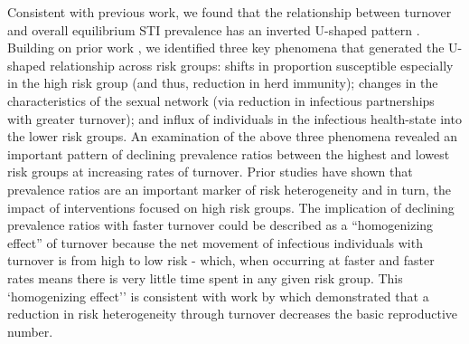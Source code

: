 Consistent with previous work, we found that the relationship between
turnover and overall equilibrium STI prevalence has
an inverted U-shaped pattern
\citep{Stigum1994,Zhang2012,Henry2015}.
Building on prior work \citep{Stigum1994,Zhang2012,Henry2015}, 
we identified three key phenomena that generated the U-shaped relationship across risk groups:
shifts in proportion susceptible especially in the high risk group (and thus, reduction in herd immunity); 
changes in the characteristics of the sexual network (via reduction in infectious partnerships with greater turnover); 
and influx of individuals in the infectious health-state into the lower risk groups.
An examination of the above three phenomena revealed an important pattern 
of declining prevalence ratios between the highest and lowest risk groups at increasing rates of turnover. 
Prior studies have shown that prevalence ratios are an important marker of risk heterogeneity and in turn, 
the impact of interventions focused on high risk groups. %
The implication of declining prevalence ratios with faster turnover could 
be described as a ``homogenizing effect'' of turnover because the 
net movement of infectious individuals with turnover is
from high to low risk - which, when occurring at faster and faster rates means there is
very little time spent in any given risk group.			%
This `homogenizing effect'' is consistent with work by 
\citet{Henry2015} which demonstrated that
 a reduction in risk heterogeneity through turnover
 decreases the basic reproductive number.
